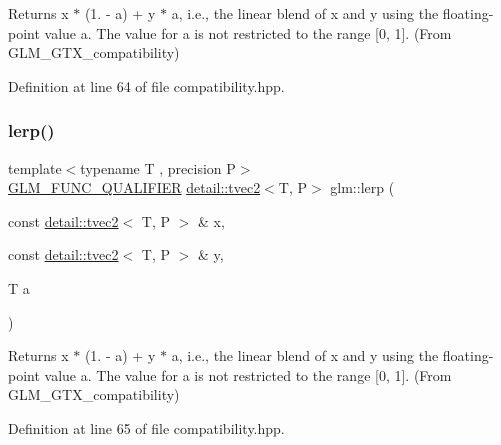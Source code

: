 Returns x $\ast$ (1. -\/ a) + y $\ast$ a, i.\+e., the linear blend of x and y using the floating-\/point value a. The value for a is not restricted to the range \mbox{[}0, 1\mbox{]}. (From G\+L\+M\+\_\+\+G\+T\+X\+\_\+compatibility) 



Definition at line 64 of file compatibility.\+hpp.

\mbox{\label{group__gtx__compatibility_gad97d71f29fcd1d51a1857a74b67490a0}} 
\subsubsection{\texorpdfstring{lerp()}{lerp()}\hspace{0.1cm}{\footnotesize\ttfamily [2/7]}}
{\footnotesize\ttfamily template$<$typename T , precision P$>$ \\
\hyperlink{setup_8hpp_a33fdea6f91c5f834105f7415e2a64407}{G\+L\+M\+\_\+\+F\+U\+N\+C\+\_\+\+Q\+U\+A\+L\+I\+F\+I\+ER} \hyperlink{structglm_1_1detail_1_1tvec2}{detail\+::tvec2}$<$T, P$>$ glm\+::lerp (\begin{DoxyParamCaption}\item[{const \hyperlink{structglm_1_1detail_1_1tvec2}{detail\+::tvec2}$<$ T, P $>$ \&}]{x,  }\item[{const \hyperlink{structglm_1_1detail_1_1tvec2}{detail\+::tvec2}$<$ T, P $>$ \&}]{y,  }\item[{T}]{a }\end{DoxyParamCaption})}



Returns x $\ast$ (1. -\/ a) + y $\ast$ a, i.\+e., the linear blend of x and y using the floating-\/point value a. The value for a is not restricted to the range \mbox{[}0, 1\mbox{]}. (From G\+L\+M\+\_\+\+G\+T\+X\+\_\+compatibility) 



Definition at line 65 of file compatibility.\+hpp.

\mbox{\label{group__gtx__compatibility_ga5680b8166d1d6a5fa70cbfb56345a5e6}} 
